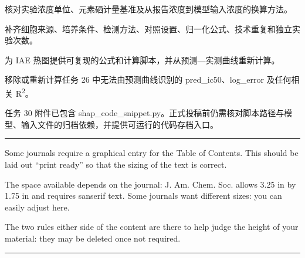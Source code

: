 \documentclass[letterpaper]{article}
\begin{document}
核对实验浓度单位、元素硒计量基准及从报告浓度到模型输入浓度的换算方法。

补齐细胞来源、培养条件、检测方法、对照设置、归一化公式、技术重复和独立实验次数。

为 IAE 热图提供可复现的公式和计算脚本，并从预测—实测曲线重新计算。

移除或重新计算任务 26 中无法由预测曲线识别的 pred\_ic50、log\_error 及任何相关 R\textsuperscript{2}。

任务 30 附件已包含 shap\_code\_snippet.py。正式投稿前仍需核对脚本路径与模型、输入文件的归档依赖，并提供可运行的代码存档入口。


\endgroup
\clearpage

\printbibliography
%

\newpage

\rule{0.05in}{1.75in}%
\begin{minipage}[b][1.75in]{3.25in}
  \sffamily
  \frenchspacing

  Some journals require a graphical entry for the Table of Contents. This
  should be laid out ``print ready'' so that the sizing of the text is correct.

  The space available depends on the journal: J. Am. Chem. Soc. allows 3.25 in
  by 1.75 in and requires sanserif text. Some journals want different sizes:
  you can easily adjust here.
  
  The two rules either side of the content are there to help judge the height
  of your material: they may be deleted once not required.
  
\end{minipage}%
\rule{0.05in}{1.75in}
\end{document}
